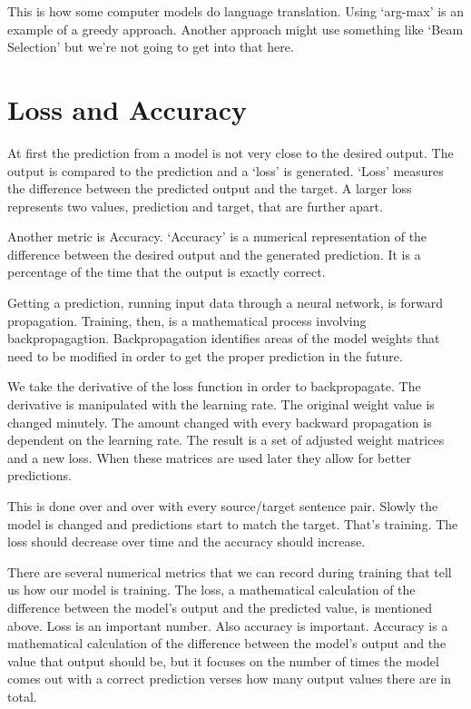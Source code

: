 This is how some computer models do language translation. Using `arg-max' is an example of a greedy approach. Another approach might use something like `Beam Selection' but we're not going to get into that here.


\section{Loss and Accuracy}

At first the prediction from a model is not very close to the desired output. The output is compared to the prediction and a `loss' is generated. `Loss' measures the difference between the predicted output and the target. A larger loss represents two values, prediction and target, that are further apart. 


Another metric is Accuracy. `Accuracy' is a numerical representation of the difference between the desired output and the generated prediction. It is a percentage of the time that the output is exactly correct.

Getting a prediction, running input data through a neural network, is forward propagation. Training, then, is a mathematical process involving backpropagagtion. Backpropagation identifies areas of the model weights that need to be modified in order to get the proper prediction in the future.

We take the derivative of the loss function in order to backpropagate. The derivative is manipulated with the learning rate. The original weight value is changed minutely. The amount changed with every backward propagation is dependent on the learning rate. The result is a set of adjusted weight matrices and a new loss. When these matrices are used later they allow for better predictions. 

This is done over and over with every source/target sentence pair. Slowly the model is changed and predictions start to match the target. That's training. The loss should decrease over time and the accuracy should increase.

There are several numerical metrics that we can record during training that tell us how our model is training. The loss, a mathematical calculation of the difference between the model's output and the predicted value, is mentioned above. Loss is an important number. Also accuracy is important. Accuracy is a mathematical calculation of the difference between the model's output and the value that output should be, but it focuses on the number of times the model comes out with a correct prediction verses how many output values there are in total.


